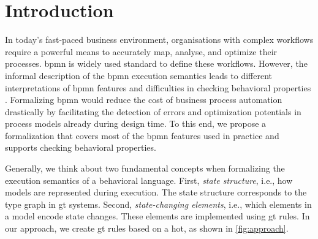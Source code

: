 \documentclass[runningheads]{llncs}
\begin{document}
\section{Introduction}
%
%
In today's fast-paced business environment, organisations with complex workflows require a powerful means to accurately map, analyse, and optimize their processes. 
\gls*{bpmn} \cite{objectmanagementgroupBusinessProcessModel2013} is widely used standard to define these workflows.
However, the informal description of the \gls*{bpmn} execution semantics leads to different interpretations of \gls*{bpmn} features and difficulties in checking behavioral properties \cite{corradiniFormalApproachAnalysis2021}.
Formalizing \gls*{bpmn} would reduce the cost of business process automation drastically by facilitating the detection of errors and optimization potentials in process models already during design time. 
To this end, we propose a formalization that covers most of the \gls*{bpmn} features used in practice and supports checking behavioral properties.

Generally, we think about two fundamental concepts when formalizing the execution semantics of a behavioral language.
First, \textit{state structure}, i.e., how models are represented during execution.
The state structure corresponds to the type graph in \gls*{gt} systems.
Second, \textit{state-changing elements}, i.e., which elements in a model encode state changes.
These elements are implemented using \gls*{gt} rules.
In our approach, we create \gls*{gt} rules based on a \gls*{hot}, as shown in \autoref{fig:approach}.
\end{document}
